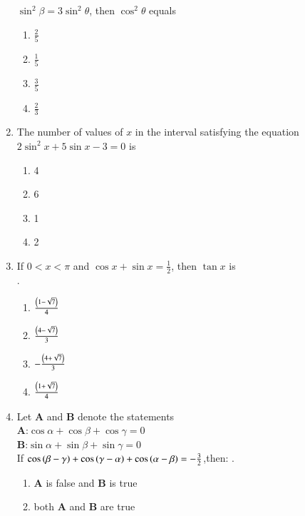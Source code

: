 \begin{enumerate}[label=\thesubsection.\arabic*,ref=\thesubsection.\theenumi]
$\sin^2 \beta=3\sin^2 \theta$, then $\cos^2 \theta$ equals \hfill{}
\begin{multicols}{2} 
\begin{enumerate}
\item $\frac{2}{5}$
\item $\frac{1}{5}$
\columnbreak
\item $\frac{3}{5}$
\item $\frac{2}{3}$
\end{enumerate} 
\end{multicols}
\item The number of values of $x$ in the interval  satisfying the equation 
\\
$2\sin^2 x+5\sin x-3=0$ is \hfill{}
\begin{multicols}{4}
\begin{enumerate}
\item 4
\columnbreak
\item 6
\columnbreak
\item 1
\columnbreak
\item 2
\end{enumerate} 
\end{multicols}
\item If $0<x<\pi$ and $\cos x+\sin x=\frac{1}{2}$, then $\tan x$ is 
\\.\hfill{}
\begin{multicols}{2} 
\begin{enumerate}
\item $\frac{\left(1-\sqrt{7}\right)}{4}$
\item $\frac{\left(4-\sqrt{7}\right)}{3}$
\columnbreak
\item $-\frac{\left(4+\sqrt{7}\right)}{3}$
\item $\frac{\left(1+\sqrt{7}\right)}{4}$
\end{enumerate} 
\end{multicols}
\item Let \textbf{A} and \textbf{B} denote the statements
\\ \textbf{A}:$\cos\alpha+\cos\beta+\cos\gamma=0$
\\ \textbf{B}:$\sin\alpha+\sin\beta+\sin\gamma=0$
\\If $\cos\left(\beta-\gamma\right)+\cos\left(\gamma-\alpha\right)+\cos\left(\alpha-\beta\right)=-\frac{3}{2}$,then:
.\hfill{}
\begin{enumerate}
\item \textbf{A} is false and \textbf{B} is true 
\item both \textbf{A} and \textbf{B} are true

\end{enumerate}
\end{enumerate}

